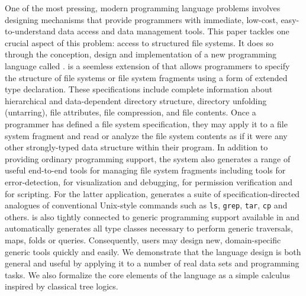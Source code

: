 One of the most pressing, modern programming language problems
involves designing mechanisms that provide programmers with immediate,
low-cost, easy-to-understand data access and data management tools.
This paper tackles one crucial aspect of this problem: access to
structured file systems.  It does so through the conception, design and
implementation of a new programming language called \forest.
\forest{} is a seemless extension of \haskell{} that allows programmers
to specify the structure of file systems or file system fragments
using a form of extended type declaration.  These specifications
include complete information about hierarchical and data-dependent directory
structure, directory unfolding (untarring), file attributes, file
compression, and file contents.  Once a programmer has defined a file
system specification, they may apply it to a file system fragment and
read or analyze the file system contents as if it were any other
strongly-typed data structure within their program.  In addition to
providing ordinary programming support, the
\forest{} system also generates a range of useful end-to-end
tools for managing file
system fragments including tools for error-detection, 
for visualization and debugging, for permission verification and for scripting.
For the latter application, \forest{} generates 
a suite of specification-directed
analogues of conventional Unix-style commands such as
{\tt ls}, {\tt grep}, {\tt tar}, {\tt cp} and others.
\forest{} is also tightly connected to generic programming support available
in \haskell{} and automatically generates all type classes necessary
to perform generic traversals, maps, folds or queries.  Consequently,
users may design new, domain-specific generic tools quickly and easily.
We demonstrate that the language design is both general and useful by
applying it to a number of real data sets and programming tasks.  We
also formalize the core elements of the language as a simple calculus
inspired by classical tree logics.

